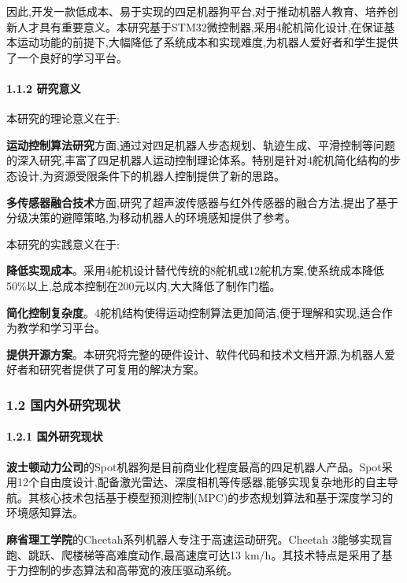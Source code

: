 \documentclass[
]{article}
\begin{document}
因此,开发一款低成本、易于实现的四足机器狗平台,对于推动机器人教育、培养创新人才具有重要意义。本研究基于STM32微控制器,采用4舵机简化设计,在保证基本运动功能的前提下,大幅降低了系统成本和实现难度,为机器人爱好者和学生提供了一个良好的学习平台。

\hypertarget{ux7814ux7a76ux610fux4e49}{%
\paragraph{1.1.2 研究意义}\label{ux7814ux7a76ux610fux4e49}}

本研究的理论意义在于:

\textbf{运动控制算法研究}方面,通过对四足机器人步态规划、轨迹生成、平滑控制等问题的深入研究,丰富了四足机器人运动控制理论体系。特别是针对4舵机简化结构的步态设计,为资源受限条件下的机器人控制提供了新的思路。

\textbf{多传感器融合技术}方面,研究了超声波传感器与红外传感器的融合方法,提出了基于分级决策的避障策略,为移动机器人的环境感知提供了参考。

本研究的实践意义在于:

\textbf{降低实现成本}。采用4舵机设计替代传统的8舵机或12舵机方案,使系统成本降低50\%以上,总成本控制在200元以内,大大降低了制作门槛。

\textbf{简化控制复杂度}。4舵机结构使得运动控制算法更加简洁,便于理解和实现,适合作为教学和学习平台。

\textbf{提供开源方案}。本研究将完整的硬件设计、软件代码和技术文档开源,为机器人爱好者和研究者提供了可复用的解决方案。

\hypertarget{ux56fdux5185ux5916ux7814ux7a76ux73b0ux72b6}{%
\subsubsection{1.2
国内外研究现状}\label{ux56fdux5185ux5916ux7814ux7a76ux73b0ux72b6}}

\hypertarget{ux56fdux5916ux7814ux7a76ux73b0ux72b6}{%
\paragraph{1.2.1
国外研究现状}\label{ux56fdux5916ux7814ux7a76ux73b0ux72b6}}

\textbf{波士顿动力公司}的Spot机器狗是目前商业化程度最高的四足机器人产品。Spot采用12个自由度设计,配备激光雷达、深度相机等传感器,能够实现复杂地形的自主导航。其核心技术包括基于模型预测控制(MPC)的步态规划算法和基于深度学习的环境感知算法。

\textbf{麻省理工学院}的Cheetah系列机器人专注于高速运动研究。Cheetah
3能够实现盲跑、跳跃、爬楼梯等高难度动作,最高速度可达13
km/h。其技术特点是采用了基于力控制的步态算法和高带宽的液压驱动系统。
\end{document}

